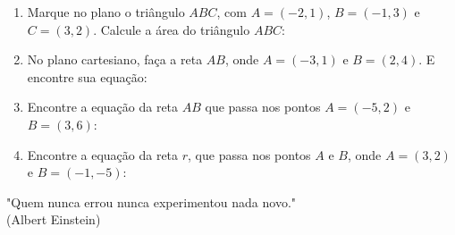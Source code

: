 \documentclass[oneside,a4paper,10pt]{article}
\begin{document}
\begin{enumerate}
\item Marque no plano o triângulo $ABC$, com $A=(-2,1)$, $B=(-1,3)$ e $C=(3,2)$. Calcule a área do triângulo $ABC$:

\item No plano cartesiano, faça a reta $AB$, onde $A=(-3,1)$ e $B=(2,4)$. E encontre sua equação:

\item Encontre a equação da reta $AB$ que passa nos pontos 	$A=(-5,2)$ e $B=(3,6)$:

\item Encontre a equação da reta $r$, que passa nos pontos $A$ e $B$, onde $A=(3,2)$ e $B=(-1,-5)$:
						
\end{enumerate}

	\vspace{14pt}
	
	\flushbottom
	\flushright
	"Quem nunca errou nunca experimentou nada novo."\\(Albert Einstein)
	
\end{document}
